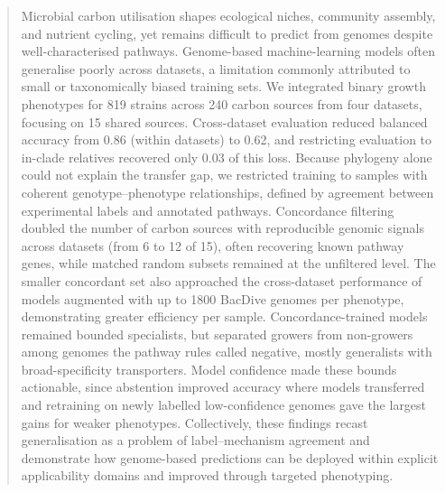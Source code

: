 
\begin{abstract}
{
\noindent
Microbial carbon utilisation shapes ecological niches, community assembly, and nutrient cycling, yet remains difficult to predict from genomes despite well-characterised pathways.
Genome-based machine-learning models often generalise poorly across datasets, a limitation commonly attributed to small or taxonomically biased training sets.
We integrated binary growth phenotypes for 819 strains across 240 carbon sources from four datasets, focusing on 15 shared sources.
Cross-dataset evaluation reduced balanced accuracy from 0.86 (within datasets) to 0.62, and restricting evaluation to in-clade relatives recovered only 0.03 of this loss.
Because phylogeny alone could not explain the transfer gap, we restricted training to samples with coherent genotype--phenotype relationships, defined by agreement between experimental labels and annotated pathways.
Concordance filtering doubled the number of carbon sources with reproducible genomic signals across datasets (from 6 to 12 of 15), often recovering known pathway genes, while matched random subsets remained at the unfiltered level.
The smaller concordant set also approached the cross-dataset performance of models augmented with up to 1800 BacDive genomes per phenotype, demonstrating greater efficiency per sample.
Concordance-trained models remained bounded specialists, but separated growers from non-growers among genomes the pathway rules called negative, mostly generalists with broad-specificity transporters.
Model confidence made these bounds actionable, since abstention improved accuracy where models transferred and retraining on newly labelled low-confidence genomes gave the largest gains for weaker phenotypes.
Collectively, these findings recast generalisation as a problem of label--mechanism agreement and demonstrate how genome-based predictions can be deployed within explicit applicability domains and improved through targeted phenotyping.
}
\end{abstract}

